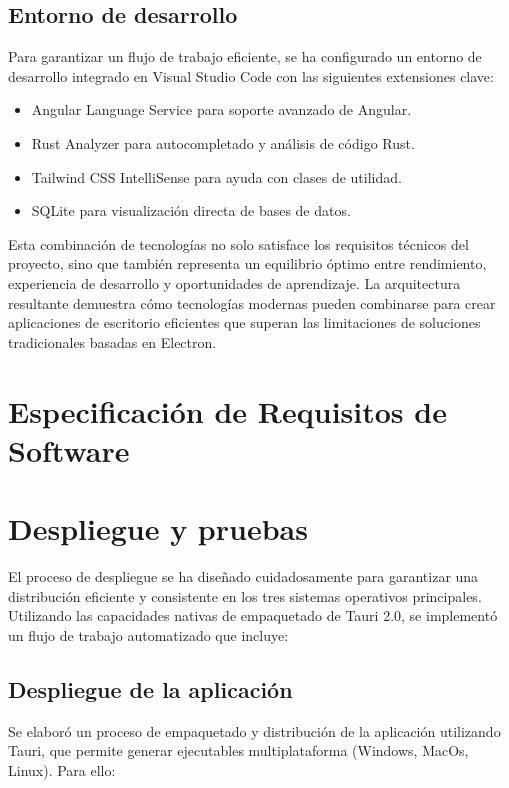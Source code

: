 \documentclass[11pt, a4paper]{article}
\begin{document}
  \subsection{Entorno de desarrollo}

  Para garantizar un flujo de trabajo eficiente, se ha configurado un entorno de desarrollo integrado en Visual Studio Code con las siguientes extensiones clave:
  \begin{itemize}
      \item Angular Language Service para soporte avanzado de Angular.
      \item Rust Analyzer para autocompletado y análisis de código Rust.
      \item Tailwind CSS IntelliSense para ayuda con clases de utilidad.
      \item SQLite para visualización directa de bases de datos.
  \end{itemize}

Esta combinación de tecnologías no solo satisface los requisitos técnicos del proyecto, sino que también representa un equilibrio óptimo entre rendimiento, experiencia de desarrollo y oportunidades de aprendizaje. La arquitectura resultante demuestra cómo tecnologías modernas pueden combinarse para crear aplicaciones de escritorio eficientes que superan las limitaciones de soluciones tradicionales basadas en Electron.

\section{Especificación de Requisitos de Software}



\section{Despliegue y pruebas}

El proceso de despliegue se ha diseñado cuidadosamente para garantizar una distribución eficiente y consistente en los tres sistemas operativos principales. Utilizando las capacidades nativas de empaquetado de Tauri 2.0, se implementó un flujo de trabajo automatizado que incluye:

        \subsection{Despliegue de la aplicación}

        Se elaboró un proceso de empaquetado y distribución de la aplicación utilizando Tauri, que permite generar ejecutables multiplataforma (Windows, MacOs, Linux). Para ello:
\end{document}
